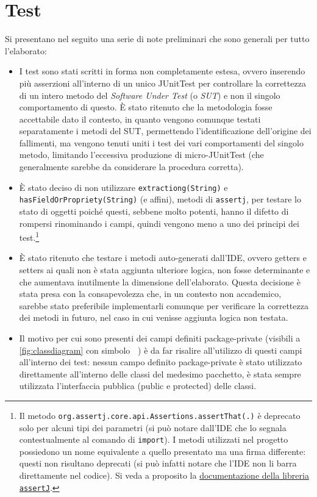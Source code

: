 \documentclass[a4paper,11pt]{article}
\begin{document}
	\section{Test}
	Si presentano nel seguito una serie di note preliminari che sono generali per tutto l'elaborato:
	\begin{itemize}\setlength\itemsep{-3pt}
		\item I test sono stati scritti in forma non completamente estesa, ovvero inserendo più asserzioni all'interno di un unico JUnitTest per controllare la correttezza di un intero metodo del \textit{Software Under Test} (o \textit{SUT}) e non il singolo comportamento di questo. È stato ritenuto che la metodologia fosse accettabile dato il contesto, in quanto vengono comunque testati separatamente i metodi del SUT, permettendo l'identificazione dell'origine dei fallimenti, ma vengono tenuti uniti i test dei vari comportamenti del singolo metodo, limitando l'eccessiva produzione di micro-JUnitTest (che generalmente sarebbe da considerare la procedura corretta).
		\item È stato deciso di non utilizzare \texttt{extractiong(String)} e \texttt{hasFieldOrPropriety(String)} (e affini), metodi di \texttt{assertj}, per testare lo stato di oggetti poiché questi, sebbene molto potenti, hanno il difetto di rompersi rinominando i campi, quindi vengono meno a uno dei principi dei test.\footnote{Il metodo \texttt{org.assertj.core.api.Assertions.assertThat(.)} è deprecato solo per alcuni tipi dei parametri (si può notare dall'IDE che lo segnala contestualmente al comando di \texttt{import}). I metodi utilizzati nel progetto possiedono un nome equivalente a quello presentato ma una firma differente: questi non risultano deprecati (si può infatti notare che l'IDE non li barra direttamente nel codice). Si veda a proposito la \href{https://www.javadoc.io/doc/org.assertj/assertj-core/3.26.0/org/assertj/core/api/Assertions.html}{documentazione della libreria \texttt{assertJ}}.}
		\item È stato ritenuto che testare i metodi auto-generati dall'IDE, ovvero getters e setters ai quali non è stata aggiunta ulteriore logica, non fosse determinante e che aumentava inutilmente la dimensione dell'elaborato. Questa decisione è stata presa con la consapevolezza che, in un contesto non accademico, sarebbe stato preferibile implementarli comunque per verificare la correttezza dei metodi in futuro, nel caso in cui venisse aggiunta logica non testata.
		\item Il motivo per cui sono presenti dei campi definiti package-private (visibili a \ref{fig:classdiagram} con simbolo \textbf{~}) è da far risalire all'utilizzo di questi campi all'interno dei test: nessun campo definito package-private è stato utilizzato direttamente all'interno delle classi del medesimo pacchetto, è stata sempre utilizzata l'interfaccia pubblica (public e protected) delle classi. 
	\end{itemize}
	
\end{document}
